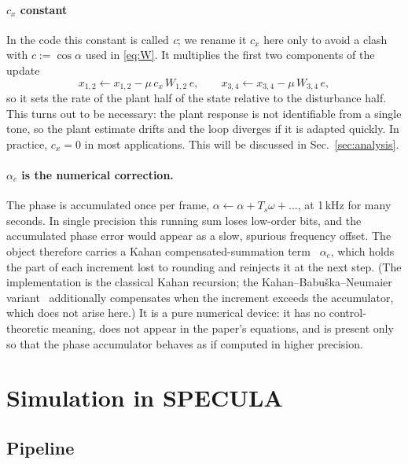 \documentclass[11pt]{article}
\newcommand{\SI}[2]{#1\,#2}
\begin{document}
\paragraph{$c_x$ constant}
In the code this constant is called \textit{c}; we rename it $c_x$ here only to avoid a clash with $c:=\cos\alpha$ used in \eqref{eq:W}.
%
It multiplies the first two components of the update
%
\begin{equation}
  x_{1,2}\leftarrow x_{1,2}-\mu\,c_x\,W_{1,2}\,e,
  \qquad
  x_{3,4}\leftarrow x_{3,4}-\mu\,W_{3,4}\,e ,
\end{equation}
%
so it sets the rate of the plant half of the state relative to the disturbance half.
%
This turns out to be necessary: the plant response is not identifiable from a single tone, so the plant estimate drifts and the loop diverges if it is adapted quickly.
%
In practice, $c_x = 0$ in most applications.
%
This will be discussed in Sec.~\ref{sec:analysis}.

\paragraph{$\alpha_c$ is the numerical correction.}
The phase is accumulated once per frame, $\alpha\leftarrow\alpha+T_s\omega+\dots$, at \SI{1}{kHz} for many seconds.
%
In single precision this running sum loses low-order bits, and the accumulated phase error would appear as a slow, spurious frequency offset.
%
The object therefore carries a Kahan compensated-summation term~\cite{kahan1965,higham1993} $\alpha_c$, which holds the part of each increment lost to rounding and reinjects it at the next step.
%
(The implementation is the classical Kahan recursion; the Kahan--Babu{\v{s}}ka--Neumaier variant~\cite{neumaier1974} additionally compensates when the increment exceeds the accumulator, which does not arise here.)
%
It is a pure numerical device: it has no control-theoretic meaning, does not appear in the paper's equations, and is present only so that the phase accumulator behaves as if computed in higher precision.

\section{Simulation in SPECULA}
\label{sec:sim}

\subsection{Pipeline}
\end{document}
